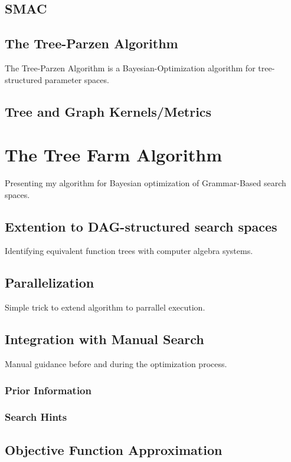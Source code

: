 \documentclass[english]{article}
\begin{document}
\subsection{SMAC}


\subsection{The Tree-Parzen Algorithm}
The Tree-Parzen Algorithm \cite{bergstra_algorithms_2011} is a Bayesian-Optimization algorithm for tree-structured parameter spaces.

\subsection{Tree and Graph Kernels/Metrics}


\section{The Tree Farm Algorithm}
Presenting my algorithm for Bayesian optimization of Grammar-Based search spaces.

\subsection{Extention to DAG-structured search spaces}
Identifying equivalent function trees with computer algebra systems.

\subsection{Parallelization}
Simple trick to extend algorithm to parrallel execution.

\subsection{Integration with Manual Search}
Manual guidance before and during the optimization process.

\subsubsection{Prior Information}
\subsubsection{Search Hints}
\subsection{Objective Function Approximation}
\end{document}
